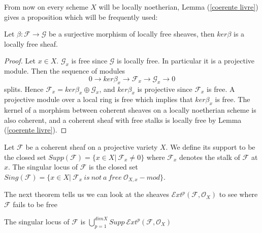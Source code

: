 \documentclass[
	oldfontcommands,
	sumario=abnt-6027-2012,
	12pt,			%
	openright,		%
	oneside,		%
	a4paper,		%
	english,		%
	brazil			%
	]{imecc-unicamp}
\begin{document}
From now on every scheme $X$ will be locally noetherian, Lemma (\ref{coerente livre}) gives a proposition which will be frequently used:
\begin{proposition}\label{kernel locally free}
Let $\beta : \mathcal{F} \to \mathcal{G}$ be a surjective morphism of locally free sheaves, then $ker \beta$ is a locally free sheaf.
\end{proposition}
\begin{proof}
Let $x \in X$. $\mathcal{G}_x$ is free since $\mathcal{G}$ is locally free. In particular it is a projective module. Then the sequence of modules
\begin{equation}
0 \to ker \beta_x \to \mathcal{F}_x \to \mathcal{G}_x \to 0
\end{equation}
splits. Hence $\mathcal{F}_x=ker \beta_x \oplus \mathcal{G}_x$, and $ker \beta_x$ is projective since $\mathcal{F}_x$ is free. A projective module over a local ring is free which implies that $ker \beta_x$ is free.
The kernel of a morphism between coherent sheaves on a locally noetherian scheme is also coherent, and a coherent sheaf with free stalks is locally free by Lemma (\ref{coerente livre}).
\end{proof}
\begin{definition}
	Let $\mathcal{F}$ be a coherent sheaf on a projective variety $X$. We define its support to be the closed set $Supp(\mathcal{F}) = \{ x \in X | \ \mathcal{F}_x \not= 0 \}$ where $\mathcal{F}_x$ denotes the stalk of $\mathcal{F}$ at $x$. The singular locus of $\mathcal{F}$ is the closed set $Sing(\mathcal{F}) = \{x \in X | \ \mathcal{F}_x 	 \ is \ not \ a \ free \ \mathcal{O}_{X,x}-mod \}$.
\end{definition}
The next theorem tells us we can look at the sheaves  $\mathcal{E}xt^p(\mathcal{F},\mathcal{O}_X)$ to see where $\mathcal{F}$ fails to be free
\begin{theorem} The singular locus of $\mathcal{F}$ is
	$\bigcup\limits_{p=1}^{dimX} Supp \ \mathcal{E}xt^p(\mathcal{F}, \mathcal{O}_X)$
\end{theorem}
\end{document}
